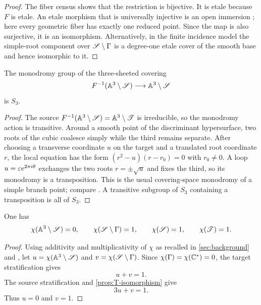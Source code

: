 \begin{proof}
The fiber census shows that the restriction is bijective.  It is etale because $F$ is etale.  An etale morphism that is universally injective is an open immersion \cite[Tag 02LC]{StacksProject}; here every geometric fiber has exactly one reduced point.  Since the map is also surjective, it is an isomorphism.  Alternatively, in the finite incidence model the simple-root component over $\mathscr S\setminus\Gamma$ is a degree-one etale cover of the smooth base and hence isomorphic to it.
\end{proof}

\begin{proposition}\label{prop:monodromy}
The monodromy group of the three-sheeted covering
\[
  F^{-1}(\mathbb A^3\setminus\mathscr S)\longrightarrow\mathbb A^3\setminus\mathscr S
\]
is $S_3$.
\end{proposition}

\begin{proof}
The source $F^{-1}(\mathbb A^3\setminus\mathscr S)=\mathbb A^3\setminus\mathscr T$ is irreducible, so the monodromy action is transitive.  Around a smooth point of the discriminant hypersurface, two roots of the cubic coalesce simply while the third remains separate.  After choosing a transverse coordinate $u$ on the target and a translated root coordinate $r$, the local equation has the form $(r^2-u)(r-r_0)=0$ with $r_0\neq0$.  A loop $u=\varepsilon e^{2\pi i\theta}$ exchanges the two roots $r=\pm\sqrt u$ and fixes the third, so its monodromy is a transposition.  This is the usual covering-space monodromy of a simple branch point; compare \cite[Section 1.3]{Hatcher2002}.  A transitive subgroup of $S_3$ containing a transposition is all of $S_3$.
\end{proof}

\begin{corollary}\label{cor:euler-strata}
One has
\[
  \chi(\mathbb A^3\setminus\mathscr S)=0,
  \qquad
  \chi(\mathscr S\setminus\Gamma)=1,
  \qquad
  \chi(\mathscr S)=1,
  \qquad
  \chi(\mathscr T)=1.
\]
\end{corollary}

\begin{proof}
Using additivity and multiplicativity of $\chi$ as recalled in \cref{sec:background} and \cite[Chapter 4]{Dimca2004}, let $u=\chi(\mathbb A^3\setminus\mathscr S)$ and $v=\chi(\mathscr S\setminus\Gamma)$.  Since $\chi(\Gamma)=\chi(\mathbb C^*)=0$, the target stratification gives
\[
  u+v=1.
\]
The source stratification and \cref{prop:T-isomorphism} give
\[
  3u+v=1.
\]
Thus $u=0$ and $v=1$.
\end{proof}

